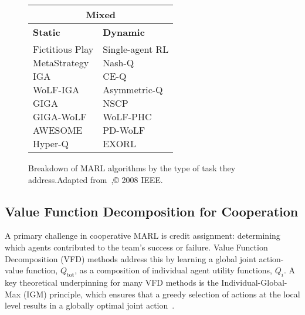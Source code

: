 \begin{figure}[ht!]
\begin{tabular}{|l|l|}
    \hline
    \multicolumn{2}{|c|}{\textbf{Mixed}} \\
    \hline
    \textbf{Static} & \textbf{Dynamic} \\
    \hline
    \makecell[l]{
        Fictitious Play  \\
        MetaStrategy\\
        IGA\\
        WoLF-IGA \\
        GIGA  \\
        GIGA-WoLF  \\
        AWESOME \\
        Hyper-Q 
    }
    &
    \makecell[l]{
        Single-agent RL  \\
        Nash-Q \\
        CE-Q  \\
        Asymmetric-Q\\
        NSCP  \\
        WoLF-PHC  \\
        PD-WoLF \\
        EXORL 
    } \\
    \hline
\end{tabular}
\caption{Breakdown of MARL algorithms by the type of task they address.Adapted from~\cite{busoniuComprehensiveSurveyMultiagent2008a},© 2008 IEEE.}\label{fig:Breakdown of MARL algorithms}
\end{figure}

\subsection{Value Function Decomposition for Cooperation}
A primary challenge in cooperative MARL is credit assignment: determining which agents contributed to the team's success or failure. Value Function Decomposition (VFD) methods address this by learning a global joint action-value function, $Q_{\text{tot}}$, as a composition of individual agent utility functions, $Q_i$. A key theoretical underpinning for many VFD methods is the Individual-Global-Max (IGM) principle, which ensures that a greedy selection of actions at the local level results in a globally optimal joint action~\cite{hongRethinkingIndividualGlobal2022}.

